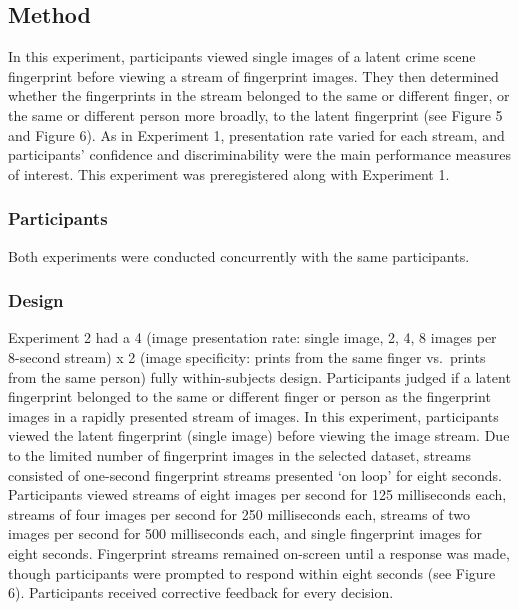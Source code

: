 \documentclass[
  english,
  man]{apa6}
\begin{document}
\hypertarget{method}{%
\subsection{Method}\label{method}}

In this experiment, participants viewed single images of a latent crime scene fingerprint before viewing a stream of fingerprint images. They then determined whether the fingerprints in the stream belonged to the same or different finger, or the same or different person more broadly, to the latent fingerprint (see Figure 5 and Figure 6). As in Experiment 1, presentation rate varied for each stream, and participants' confidence and discriminability were the main performance measures of interest. This experiment was preregistered along with Experiment 1.

\hypertarget{participants-1}{%
\subsubsection{Participants}\label{participants-1}}

Both experiments were conducted concurrently with the same participants.

\hypertarget{design-1}{%
\subsubsection{Design}\label{design-1}}

Experiment 2 had a 4 (image presentation rate: single image, 2, 4, 8 images per 8-second stream) x 2 (image specificity: prints from the same finger vs.~prints from the same person) fully within-subjects design. Participants judged if a latent fingerprint belonged to the same or different finger or person as the fingerprint images in a rapidly presented stream of images. In this experiment, participants viewed the latent fingerprint (single image) before viewing the image stream. Due to the limited number of fingerprint images in the selected dataset, streams consisted of one-second fingerprint streams presented `on loop' for eight seconds. Participants viewed streams of eight images per second for 125 milliseconds each, streams of four images per second for 250 milliseconds each, streams of two images per second for 500 milliseconds each, and single fingerprint images for eight seconds. Fingerprint streams remained on-screen until a response was made, though participants were prompted to respond within eight seconds (see Figure 6). Participants received corrective feedback for every decision.
\end{document}
